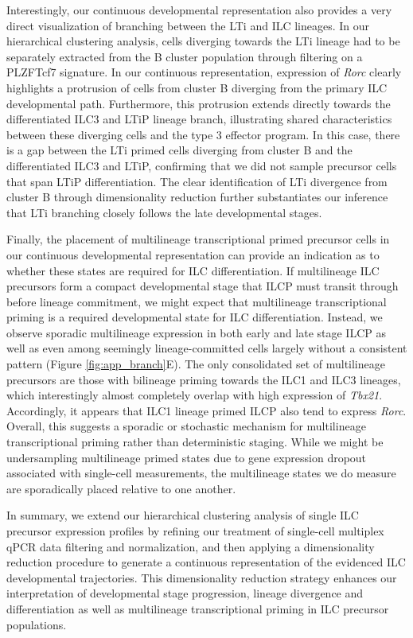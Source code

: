 \begin{subappendices}
Interestingly, our continuous developmental representation also provides a very direct visualization of branching between the LTi and ILC lineages. In our hierarchical clustering analysis, cells diverging towards the LTi lineage had to be separately extracted from the B cluster population through filtering on a PLZF\UM Tcf7\UP{} signature. In our continuous representation, expression of \textit{Rorc} clearly highlights a protrusion of cells from cluster B diverging from the primary ILC developmental path. Furthermore, this protrusion extends directly towards the differentiated ILC3 and LTiP lineage branch, illustrating shared characteristics between these diverging cells and the type 3 effector program. In this case, there is a gap between the LTi primed cells diverging from cluster B and the differentiated ILC3 and LTiP, confirming that we did not sample precursor cells that span LTiP differentiation. The clear identification of LTi divergence from cluster B through dimensionality reduction further substantiates our inference that LTi branching closely follows the late \aLP developmental stages. 

Finally, the placement of multilineage transcriptional primed precursor cells in our continuous developmental representation can provide an indication as to whether these states are required for ILC differentiation. If multilineage ILC precursors form a compact developmental stage that ILCP must transit through before lineage commitment, we might expect that multilineage transcriptional priming is a required developmental state for ILC differentiation. Instead, we observe sporadic multilineage expression in both early and late stage ILCP as well as even among seemingly lineage-committed cells largely without a consistent pattern (Figure \ref{fig:app_branch}E). The only consolidated set of multilineage precursors are those with bilineage priming towards the ILC1 and ILC3 lineages, which interestingly almost completely overlap with high expression of \textit{Tbx21}. Accordingly, it appears that ILC1 lineage primed ILCP also tend to express \textit{Rorc}. Overall, this suggests a sporadic or stochastic mechanism for multilineage transcriptional priming rather than deterministic staging. While we might be undersampling multilineage primed states due to gene expression dropout associated with single-cell measurements, the multilineage states we do measure are sporadically placed relative to one another. 

In summary, we extend our hierarchical clustering analysis of single ILC precursor expression profiles by refining our treatment of single-cell multiplex qPCR data filtering and normalization, and then applying a dimensionality reduction procedure to generate a continuous representation of the evidenced ILC developmental trajectories. This dimensionality reduction strategy enhances our interpretation of developmental stage progression, lineage divergence and differentiation as well as multilineage transcriptional priming in ILC precursor populations.

\end{subappendices}



